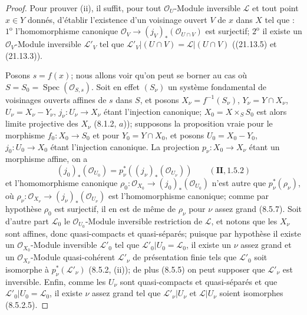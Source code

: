 \begin{proof}
Pour prouver (ii), il suffit, pour tout $\mathcal O_U$-Module inversible $\mathscr L$
et tout point $x\in Y$ donnés, d'établir l'existence d'un voisinage ouvert $V$ de $x$
dans $X$ tel que : $1^{\mathrm o}$ l'homomorphisme canonique
$\mathcal O_V\to(j_V)_*(\mathcal O_{U\cap V})$ est surjectif;
$2^{\mathrm o}$ il existe un $\mathcal O_V$-Module inversible $\mathscr L'_V$ tel que
$\mathscr L'_V|(U\cap V)=\mathscr L|(U\cap V)$ ((21.13.5) et (21.13.3)).

Posons $s=f(x)$; nous allons voir qu'on peut se borner au cas où
$S=S_0=\operatorname{Spec}(\mathcal O_{S,s})$. Soit en effet $(S_\nu)$ un système
fondamental de voisinages ouverts affines de $s$ dans $S$, et posons
$X_\nu=f^{-1}(S_\nu)$, $Y_\nu=Y\cap X_\nu$, $U_\nu=X_\nu-Y_\nu$,
$j_\nu:U_\nu\to X_\nu$ étant l'injection canonique; $X_0=X\times_S S_0$ est alors
limite projective des $X_\nu$ (8.1.2, $a$)); supposons la proposition vraie pour le
morphisme $f_0:X_0\to S_0$ et pour $Y_0=Y\cap X_0$, et posons $U_0=X_0-Y_0$,
$j_0:U_0\to X_0$ étant l'injection canonique. La projection
$p_\nu:X_0\to X_\nu$ étant un morphisme affine, on a
\[
  (j_0)_*(\mathcal O_{U_0})
  =p_\nu^*((j_\nu)_*(\mathcal O_{U_\nu}))
  \qquad(\mathbf{II}, 1.5.2)
\]
et l'homomorphisme canonique
$\rho_0:\mathcal O_{X_0}\to(j_0)_*(\mathcal O_{U_0})$ n'est autre que
$p_\nu^*(\rho_\nu)$, où
$\rho_\nu:\mathcal O_{X_\nu}\to(j_\nu)_*(\mathcal O_{U_\nu})$ est l'homomorphisme
canonique; comme par hypothèse $\rho_0$ est surjectif, il en est de même de $\rho_\nu$
pour $\nu$ assez grand (8.5.7). Soit d'autre part $\mathscr L_0$ le
$\mathcal O_{U_0}$-Module inversible restriction de $\mathscr L$, et notons que les
$X_\nu$ sont affines, donc quasi-compacts et quasi-séparés; puisque par hypothèse il
existe un $\mathcal O_{X_0}$-Module inversible $\mathscr L'_0$ tel que
$\mathscr L'_0|U_0=\mathscr L_0$, il existe un $\nu$ assez grand et un
$\mathcal O_{X_\nu}$-Module quasi-cohérent $\mathscr L'_\nu$ de présentation finie
tels que $\mathscr L'_0$ soit isomorphe à $p_\nu^*(\mathscr L'_\nu)$ (8.5.2, (ii));
de plus (8.5.5) on peut supposer que $\mathscr L'_\nu$ est inversible. Enfin, comme
les $U_\nu$ sont quasi-compacts et quasi-séparés et que
$\mathscr L'_0|U_0=\mathscr L_0$, il existe $\nu$ assez grand tel que
$\mathscr L'_\nu|U_\nu$ et $\mathscr L|U_\nu$ soient isomorphes (8.5.2.5).


\end{proof}
